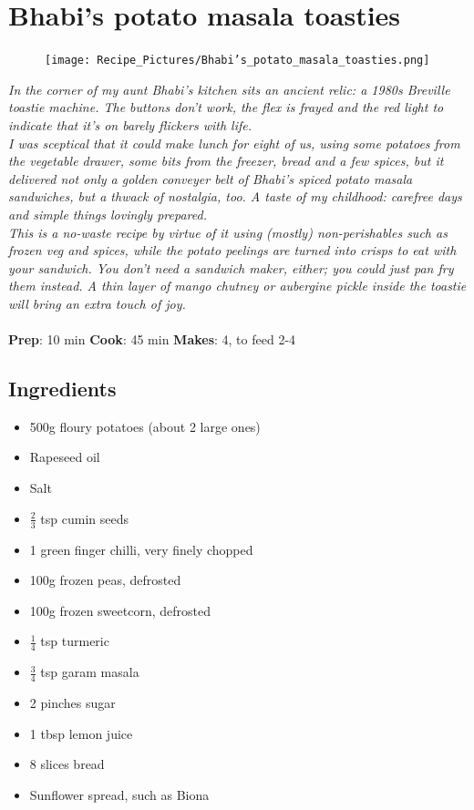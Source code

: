 \documentclass{book}
\begin{document}
\section{Bhabi’s potato masala toasties}
\begin{figure}
\centering\texttt{[image: Recipe\_Pictures/Bhabi’s\_potato\_masala\_toasties.png]}
\end{figure}
\emph{In the corner of my aunt Bhabi’s kitchen sits an ancient relic: a 1980s Breville toastie machine. The buttons don’t work, the flex is frayed and the red light to indicate that it’s on barely flickers with life. \\ 
I was sceptical that it could make lunch for eight of us, using some potatoes from the vegetable drawer, some bits from the freezer, bread and a few spices, but it delivered not only a golden conveyer belt of Bhabi’s spiced potato masala sandwiches, but a thwack of nostalgia, too. A taste of my childhood: carefree days and simple things lovingly prepared.\\ 
This is a no-waste recipe by virtue of it using (mostly) non-perishables such as frozen veg and spices, while the potato peelings are turned into crisps to eat with your sandwich. You don’t need a sandwich maker, either; you could just pan fry them instead. A thin layer of mango chutney or aubergine pickle inside the toastie will bring an extra touch of joy.}\\\\ 
\textbf{Prep}: 10 min
\textbf{Cook}: 45 min
\textbf{Makes}: 4, to feed 2-4
\subsection*{Ingredients}
\begin{itemize}
\item 500g floury potatoes (about 2 large ones)
\item Rapeseed oil
\item Salt
\item $\frac{2}{3}$ tsp cumin seeds
\item 1 green finger chilli, very finely chopped
\item 100g frozen peas, defrosted 
\item 100g frozen sweetcorn, defrosted
\item $\frac{1}{4}$ tsp turmeric
\item $\frac{3}{4}$ tsp garam masala
\item 2 pinches sugar
\item 1 tbsp lemon juice
\item 8 slices bread
\item Sunflower spread, such as Biona
\end{itemize}
\end{document}
